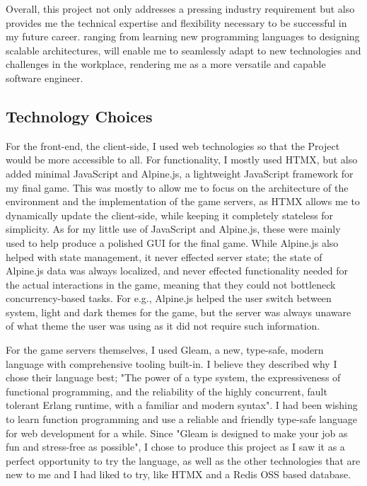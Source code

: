 \documentclass[]{final}
\begin{document}
Overall, this project not only addresses a pressing industry requirement but also provides
me the technical expertise and flexibility necessary to be successful in my future career.
ranging from learning new programming languages to designing scalable architectures, will enable me to
seamlessly adapt to new technologies and challenges in the workplace, rendering me as a more
versatile and capable software engineer.

\newpage

\subsection{Technology Choices}
For the front-end, the client-side, I used web technologies so that the Project
would be more accessible to all. For functionality, I mostly used HTMX,
but also added minimal JavaScript and Alpine.js, a lightweight JavaScript
framework for my final game. %
This was mostly to allow me to focus on the
architecture of the environment and the implementation of the game
servers, as HTMX allows me to dynamically update the client-side, while
keeping it completely stateless for simplicity. As for my little use of
JavaScript and Alpine.js, these were mainly used to help produce a polished
GUI for the final game. While Alpine.js also helped with state management,
it never effected server state; the state of Alpine.js data was always
localized, and never effected functionality needed for the actual interactions
in the game, meaning that they could not bottleneck concurrency-based tasks.
For e.g., Alpine.js helped the user switch between system, light and dark
themes for the game, but the server was always unaware of what theme the user
was using as it did not require such information.

\label{REDISOSS}

For the game servers themselves, I used Gleam, a new, type-safe, modern
language with comprehensive tooling built-in. I believe they described why I
chose their language best; "The power of a type system, the expressiveness
of functional programming, and the reliability of the highly concurrent,
fault tolerant Erlang runtime, with a familiar and modern syntax".
I had been wishing to learn function programming and use a reliable and friendly
type-safe language for web development for a while.
Since "Gleam is designed to make your job as fun and stress-free as possible",
I chose to produce this project as I saw it as a perfect opportunity to try the
language, as well as the other technologies that are new to me and I had liked
to try, like HTMX and a Redis OSS based database.
\end{document}
